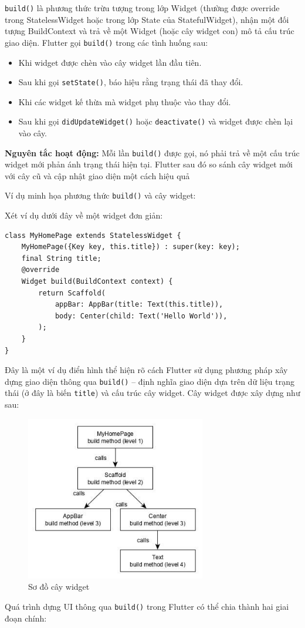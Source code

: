 \documentclass[../DoAn.tex]{subfiles}
\numberwithin{figure}{chapter}
\begin{document}
\texttt{build()} là phương thức trừu tượng trong lớp Widget (thường được override trong StatelessWidget hoặc trong lớp State của StatefulWidget), nhận một đối tượng BuildContext và trả về một Widget (hoặc cây widget con) mô tả cấu trúc giao diện. Flutter gọi \texttt{build()} trong các tình huống sau:
\begin{itemize}
\item Khi widget được chèn vào cây widget lần đầu tiên.
\item Sau khi gọi \texttt{setState()}, báo hiệu rằng trạng thái đã thay đổi.
\item Khi các widget kế thừa mà widget phụ thuộc vào thay đổi.
\item Sau khi gọi \texttt{didUpdateWidget()} hoặc \texttt{deactivate()} và widget được chèn lại vào cây.
\end{itemize}
\textbf{Nguyên tắc hoạt động:} Mỗi lần \texttt{build()} được gọi, nó phải trả về một cấu trúc widget mới phản ánh trạng thái hiện tại. Flutter sau đó so sánh cây widget mới với cây cũ và cập nhật giao diện một cách hiệu quả 

Ví dụ minh họa phương thức \texttt{build()} và cây widget:

Xét ví dụ dưới đây về một widget đơn giản:
\begin{lstlisting}
class MyHomePage extends StatelessWidget {
    MyHomePage({Key key, this.title}) : super(key: key);
    final String title;
    @override
    Widget build(BuildContext context) {
        return Scaffold(
            appBar: AppBar(title: Text(this.title)),
            body: Center(child: Text('Hello World')),
        );
    }
}    
\end{lstlisting}

Đây là một ví dụ điển hình thể hiện rõ cách Flutter sử dụng phương pháp xây dựng giao diện thông qua \texttt{build()} – định nghĩa giao diện dựa trên dữ liệu trạng thái (ở đây là biến \texttt{title}) và cấu trúc cây widget. Cây widget được xây dựng như sau:
\begin{figure}[H]
    \centering
    \includegraphics[width=0.7\textwidth]{Hinhve/Chuong5/widgettree.png}
    \caption{Sơ đồ cây widget}
    \label{fig:widgettree}
\end{figure}
Quá trình dựng UI thông qua \texttt{build()} trong Flutter có thể chia thành hai giai đoạn chính:
\end{document}
